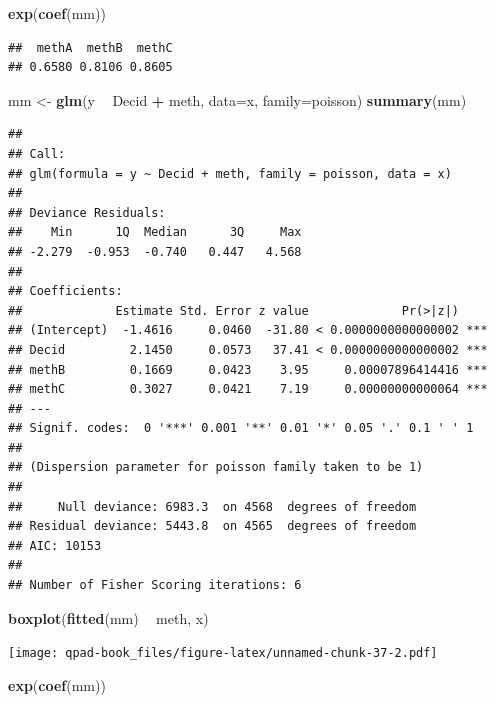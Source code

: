 \documentclass[12pt,]{book}
\newenvironment{Shaded}{\begin{snugshade}}{\end{snugshade}}
\newcommand{\DataTypeTok}[1]{\textcolor[rgb]{0.13,0.29,0.53}{#1}}
\newcommand{\KeywordTok}[1]{\textcolor[rgb]{0.13,0.29,0.53}{\textbf{#1}}}
\newcommand{\NormalTok}[1]{#1}
\newcommand{\OperatorTok}[1]{\textcolor[rgb]{0.81,0.36,0.00}{\textbf{#1}}}
\newcommand{\StringTok}[1]{\textcolor[rgb]{0.31,0.60,0.02}{#1}}
\begin{document}
\begin{Shaded}
\begin{Highlighting}[]
\KeywordTok{exp}\NormalTok{(}\KeywordTok{coef}\NormalTok{(mm))}
\end{Highlighting}
\end{Shaded}

\begin{verbatim}
##  methA  methB  methC 
## 0.6580 0.8106 0.8605
\end{verbatim}

\begin{Shaded}
\begin{Highlighting}[]
\NormalTok{mm <-}\StringTok{ }\KeywordTok{glm}\NormalTok{(y }\OperatorTok{~}\StringTok{ }\NormalTok{Decid }\OperatorTok{+}\StringTok{ }\NormalTok{meth, }\DataTypeTok{data=}\NormalTok{x, }\DataTypeTok{family=}\NormalTok{poisson)}
\KeywordTok{summary}\NormalTok{(mm)}
\end{Highlighting}
\end{Shaded}

\begin{verbatim}
## 
## Call:
## glm(formula = y ~ Decid + meth, family = poisson, data = x)
## 
## Deviance Residuals: 
##    Min      1Q  Median      3Q     Max  
## -2.279  -0.953  -0.740   0.447   4.568  
## 
## Coefficients:
##             Estimate Std. Error z value             Pr(>|z|)    
## (Intercept)  -1.4616     0.0460  -31.80 < 0.0000000000000002 ***
## Decid         2.1450     0.0573   37.41 < 0.0000000000000002 ***
## methB         0.1669     0.0423    3.95     0.00007896414416 ***
## methC         0.3027     0.0421    7.19     0.00000000000064 ***
## ---
## Signif. codes:  0 '***' 0.001 '**' 0.01 '*' 0.05 '.' 0.1 ' ' 1
## 
## (Dispersion parameter for poisson family taken to be 1)
## 
##     Null deviance: 6983.3  on 4568  degrees of freedom
## Residual deviance: 5443.8  on 4565  degrees of freedom
## AIC: 10153
## 
## Number of Fisher Scoring iterations: 6
\end{verbatim}

\begin{Shaded}
\begin{Highlighting}[]
\KeywordTok{boxplot}\NormalTok{(}\KeywordTok{fitted}\NormalTok{(mm) }\OperatorTok{~}\StringTok{ }\NormalTok{meth, x)}
\end{Highlighting}
\end{Shaded}

\texttt{[image: qpad-book\_files/figure-latex/unnamed-chunk-37-2.pdf]}

\begin{Shaded}
\begin{Highlighting}[]
\KeywordTok{exp}\NormalTok{(}\KeywordTok{coef}\NormalTok{(mm))}
\end{Highlighting}
\end{Shaded}
\end{document}

